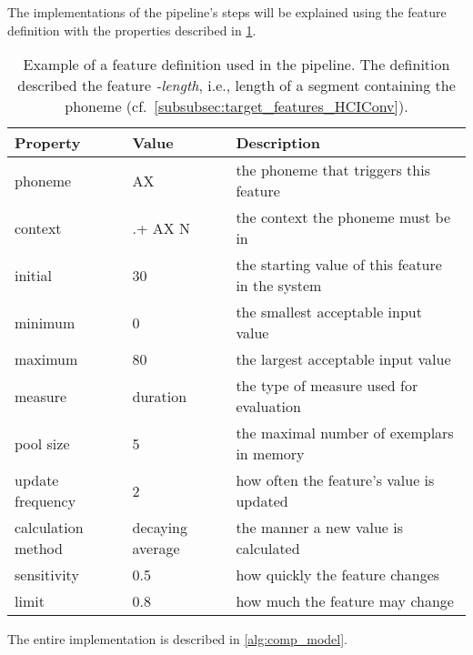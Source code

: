 The implementations of the pipeline's steps will be explained using the feature definition with the properties described in \cref{tab:feature_definition}.
%
\begin{table}[t]
	\centering
	\caption[Feature definition example]
		{Example of a feature definition used in the pipeline.
		 The definition described  the feature \emph{-length}, i.e., length of a segment containing the phoneme \textipa{[@]} (cf.\ \cref{subsubsec:target_features_HCIConv}).}
	\label{tab:feature_definition}
	\begin{tabularx}{\linewidth}{Xll}
		\toprule
		Property			& Value				& Description\\
		\midrule
		phoneme				& AX				& the phoneme that triggers this feature\\
		context				& .+ AX N			& the context the phoneme must be in\\
		initial				& 30				& the starting value of this feature in the system\\
		minimum				& 0					& the smallest acceptable input value\\
		maximum				& 80				& the largest acceptable input value\\
		measure				& duration			& the type of measure used for evaluation\\
		pool size			& 5					& the maximal number of exemplars in memory\\
		update frequency	& 2					& how often the feature's value is updated\\
		calculation method	& decaying average  & the manner a new value is calculated\\
		sensitivity			& 0.5				& how quickly the feature changes\\
		limit				& 0.8				& how much the feature may change\\
		\bottomrule
	\end{tabularx}
\end{table}
%
%
The entire implementation is described in \cref{alg:comp_model}.
%
\addtocounter{myequations}{1}

